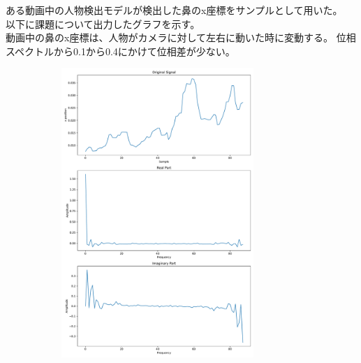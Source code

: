 \documentclass[10pt,dvipdfmx]{jsarticle}
\begin{document}
ある動画中の人物検出モデルが検出した鼻のx座標をサンプルとして用いた。\\
以下に課題について出力したグラフを示す。\\
動画中の鼻のx座標は、人物がカメラに対して左右に動いた時に変動する。
位相スペクトルから0.1から0.4にかけて位相差が少ない。
  \begin{figure}[h]
    \centering
\begin{subfigure}[b]{0.45\textwidth}
      \includegraphics[width=0.8\textwidth]{DFT1.pdf}
      \label{1}
\end{subfigure}
\begin{subfigure}[b]{0.45\textwidth}

\end{subfigure}
\end{figure}
\end{document}
